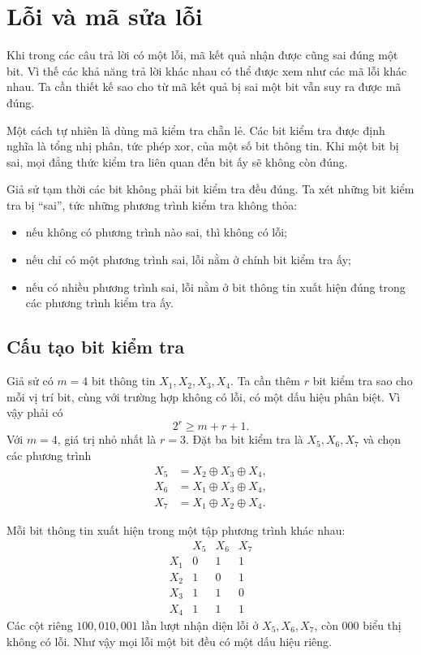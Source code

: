 \documentclass[11pt]{article}
\newcommand{\xor}{\oplus}
\begin{document}
\section{Lỗi và mã sửa lỗi}

Khi trong các câu trả lời có một lỗi, mã kết quả nhận được cũng sai đúng một
bit. Vì thế các khả năng trả lời khác nhau có thể được xem như các mã lỗi
khác nhau. Ta cần thiết kế  sao cho từ mã kết quả bị sai
một bit vẫn suy ra được mã đúng.

Một cách tự nhiên là dùng mã kiểm tra chẵn lẻ. Các bit kiểm tra được định
nghĩa là tổng nhị phân, tức phép xor, của một số bit thông tin. Khi một bit
bị sai, mọi đẳng thức kiểm tra liên quan đến bit ấy sẽ không còn đúng.

Giả sử tạm thời các bit không phải bit kiểm tra đều đúng. Ta xét những bit
kiểm tra bị ``sai'', tức những phương trình kiểm tra không thỏa:
\begin{itemize}
  \item nếu không có phương trình nào sai, thì không có lỗi;
  \item nếu chỉ có một phương trình sai, lỗi nằm ở chính bit kiểm tra ấy;
  \item nếu có nhiều phương trình sai, lỗi nằm ở bit thông tin xuất hiện
  đúng trong các phương trình kiểm tra ấy.
\end{itemize}

\subsection{Cấu tạo bit kiểm tra}

Giả sử có \(m=4\) bit thông tin \(X_1,X_2,X_3,X_4\). Ta cần thêm \(r\) bit
kiểm tra sao cho mỗi vị trí bit, cùng với trường hợp không có lỗi, có một
dấu hiệu phân biệt. Vì vậy phải có
\[
  2^r \ge m+r+1.
\]
Với \(m=4\), giá trị nhỏ nhất là \(r=3\). Đặt ba bit kiểm tra là
\(X_5,X_6,X_7\) và chọn các phương trình
\[
\begin{aligned}
  X_5 &= X_2 \xor X_3 \xor X_4,\\
  X_6 &= X_1 \xor X_3 \xor X_4,\\
  X_7 &= X_1 \xor X_2 \xor X_4.
\end{aligned}
\]

Mỗi bit thông tin xuất hiện trong một tập phương trình khác nhau:
\[
\begin{array}{c|ccc}
 & X_5 & X_6 & X_7\\ \hline
X_1 & 0 & 1 & 1\\
X_2 & 1 & 0 & 1\\
X_3 & 1 & 1 & 0\\
X_4 & 1 & 1 & 1
\end{array}
\]
Các cột riêng \(100,010,001\) lần lượt nhận diện lỗi ở \(X_5,X_6,X_7\), còn
\(000\) biểu thị không có lỗi. Như vậy mọi lỗi một bit đều có một dấu hiệu
riêng.
\end{document}
